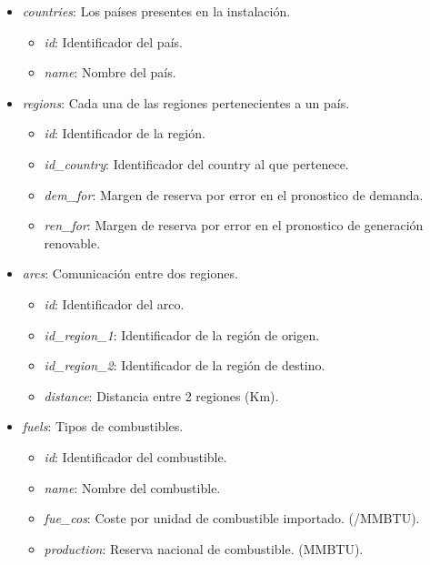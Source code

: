\begin{itemize}
	
	\item \textit{countries}: Los países presentes en la instalación.
	\begin{itemize}
		\item \textit{id}: Identificador del país.		
		\item \textit{name}: Nombre del país.
	\end{itemize}
	
	\item \textit{regions}: Cada una de las regiones pertenecientes a un país.
	\begin{itemize}
		\item \textit{id}: Identificador de la región.		
		\item \textit{id\_country}: Identificador del country al que pertenece.
		\item \textit{dem\_for}: Margen de reserva por error en el pronostico de demanda.
		\item \textit{ren\_for}: Margen de reserva por error en el pronostico de generación renovable.
	\end{itemize}

	\item \textit{arcs}: Comunicación entre dos regiones.
	\begin{itemize}
		\item \textit{id}: Identificador del arco.		
		\item \textit{id\_region\_1}: Identificador de la región de origen.
		\item \textit{id\_region\_2}: Identificador de la región de destino.
		\item \textit{distance}: Distancia entre 2 regiones (Km).
	\end{itemize}
	
	\item \textit{fuels}: Tipos de combustibles.
	\begin{itemize}
		\item \textit{id}: Identificador del combustible.		
		\item \textit{name}: Nombre del combustible.
		\item \textit{fue\_cos}: Coste por unidad de combustible importado. (\textdollar/MMBTU).
		\item \textit{production}: Reserva nacional de combustible. (MMBTU).
	\end{itemize}
	

\end{itemize}

